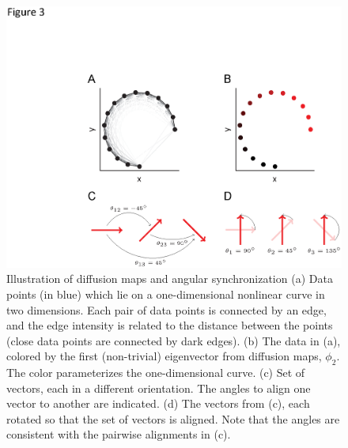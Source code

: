 \documentclass{pnastwo}
\begin{document}
\begin{figure}
\includegraphics{figures_0329_mac_3}
\caption{Illustration of diffusion maps and angular synchronization (a) Data points (in blue) which lie on a one-dimensional nonlinear curve in two dimensions. Each pair of data points is connected by an edge, and the edge intensity is related to the distance between the points (close data points are connected by dark edges). (b) The data in (a), colored by the first (non-trivial) eigenvector from diffusion maps, $\phi_2$. The color parameterizes the one-dimensional curve. (c) Set of vectors, each in a different orientation. The angles to align one vector to another are indicated. (d) The vectors from (c), each rotated so that the set of vectors is aligned. Note that the angles are consistent with the pairwise alignments in (c). }
\label{fig:schematics}
\end{figure}
\end{document}
